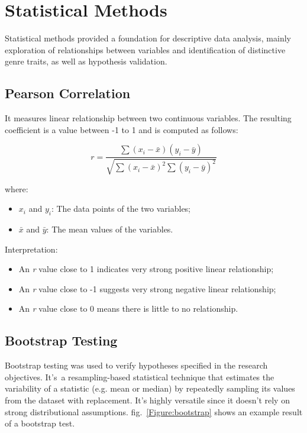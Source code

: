 \section{Statistical Methods}
\label{sec:statisticalmethods}

Statistical methods provided a foundation for descriptive data analysis, mainly
exploration of relationships between variables and identification of distinctive
genre traits, as well as hypothesis validation.

\subsection{Pearson Correlation}

It measures linear relationship between two continuous variables. The resulting
coefficient is a value between -1 to 1 and is computed as follows: 

\[
r = \frac{\sum{(x_i - \bar{x})(y_i - \bar{y})}}{\sqrt{\sum{(x_i - \bar{x})^2} \sum{(y_i - \bar{y})^2}}}
\]

\noindent \noindent where:
\begin{itemize}
    \item \( x_i \) and \( y_i \): The data points of the two variables;
    \item \( \bar{x} \) and \( \bar{y} \): The mean values of the variables.
\end{itemize}

\noindent \noindent Interpretation:
\begin{itemize}
  \item An \textit{r} value close to 1 indicates very strong positive linear
    relationship;
  \item An \textit{r} value close to -1 suggests very strong negative linear
    relationship;
  \item An \textit{r} value close to 0 means there is little to no relationship.
\end{itemize}



\subsection{Bootstrap Testing}

Bootstrap testing was used to verify hypotheses specified in the research
objectives. It's~a resampling-based statistical technique that estimates the
variability of a statistic (e.g. mean or median)  by repeatedly sampling its
values from the dataset with replacement. It's highly versatile since it
doesn't rely on strong distributional assumptions. fig.~\ref{Figure:bootstrap}
shows an example result of a bootstrap test.


